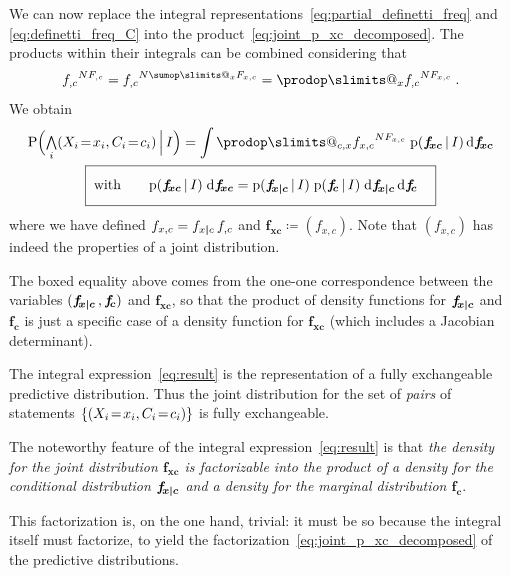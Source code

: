 \documentclass[\ifafour a4paper,12pt,\else a5paper,10pt,\fi%
onecolumn,oneside,article,%
british%
]{memoir}
\makeatletter
\theoremstyle{remark}
\theoremstyle{innote}
\def\sum{\DOTSI\sumop\slimits@}
\def\prod{\DOTSI\prodop\slimits@}
\newcommand*{\di}{\mathrm{d}}%
\newcommand*{\defd}{\coloneqq}
\newcommand*{\Land}{\mathop{\textstyle\bigwedge}}
\DeclarePairedDelimiter\set{\{}{\}}
\newcommand*{\pf}{\mathrm{p}}%
\newcommand*{\p}{\mathrm{P}}%
\renewcommand*{\|}[1][]{\nonscript\,#1\vert\nonscript\,\mathopen{}}
\renewcommand*{\=}{\TextOrMath\texteq\eq}
\newcommand*{\X}[1]{X_{#1}}
\newcommand*{\x}[1]{x_{#1}}
\newcommand*{\C}[1]{C_{#1}}
\newcommand*{\cc}[1]{c_{#1}}
\newcommand*{\fxc}{\bm{f_{\!x\bcond c}}}
\newcommand*{\fc}{\bm{f_{\!c}}}
\newcommand*{\fj}{\bm{f_{\!xc}}}
\newcommand*{\bcond}[1][]{\nonscript\,#1\bm{\vert}\nonscript\;\mathopen{}}
\makeatother
\begin{document}
We can now replace the integral
representations~\eqref{eq:partial_definetti_freq} and
\eqref{eq:definetti_freq_C} into the
product~\eqref{eq:joint_p_xc_decomposed}. The products within their
integrals can be combined considering that
\begin{equation}
  \label{eq:develop_prodfc}
  {f_{,c}}^{N F_{,c}} = {f_{,c}}^{N \sum_{x}F_{x,c}} =
  \prod_{x} {f_{,c}}^{N F_{x,c}} \;.
\end{equation}
We obtain
\begin{subequations}
  \label{eq:result}
  \begin{gather}
    \label{eq:integral_predictive_joint}
     \p\Bigl(\Land_{i} (\X{i}\=\x{i}, \C{i}\=\cc{i}) \|[\Big] I\Bigr) =
\int\prod_{c,x} {f_{x,c}}^{N F_{x, c}}\;  \pf(\fj\|I)\,\di\fj
\\
  \label{eq:factorizable}
\boxed{\;\text{with}\qquad \vphantom{\int}\pf(\fj\|I)\;\di\fj =
\pf(\fxc \| I)  \;
\pf(\fc \| I) \;\di\fxc\,\di\fc \quad}
\end{gather}
\end{subequations}
where we have defined $f_{x,c} = f_{x \bcond c}\, f_{,c}$ and
$\fj \defd (f_{x,c})$. Note that $(f_{x,c})$ has indeed the properties of a
joint distribution.

The boxed equality above comes from the one-one correspondence between the
variables $(\fxc \,,\fc)$ and $\fj$, so that the product of density
functions for $\fxc$ and $\fc$ is just a specific case of a density
function for $\fj$ (which includes a Jacobian determinant).



The integral expression~\eqref{eq:result} is the representation of a fully
exchangeable predictive distribution. Thus the joint distribution for the
set of \emph{pairs} of statements $\set{(\X{i}\=\x{i}, \C{i}\=\cc{i})}$ is
fully exchangeable.

The noteworthy feature of the integral expression~\eqref{eq:result} is that
\emph{the density for the joint distribution $\fj$ is factorizable into the
  product of a density for the conditional distribution $\fxc$ and a
  density for the marginal distribution $\fc$}.

This factorization is, on the one hand, trivial: it must be so because the
integral itself must factorize, to yield the
factorization~\eqref{eq:joint_p_xc_decomposed} of the predictive
distributions.
\end{document}
